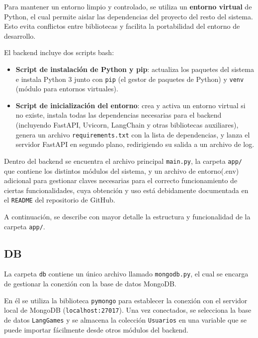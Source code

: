 Para mantener un entorno limpio y controlado, se utiliza un \textbf{entorno virtual} de Python, el cual permite aislar las dependencias del proyecto del resto del sistema. Esto evita conflictos entre bibliotecas y facilita la portabilidad del entorno de desarrollo.

El backend incluye dos scripts bash:

\begin{itemize}
	\item \textbf{Script de instalación de Python y pip}: actualiza los paquetes del sistema e instala Python 3 junto con \texttt{pip} (el gestor de paquetes de Python) y \texttt{venv} (módulo para entornos virtuales).
	
	\item \textbf{Script de inicialización del entorno}: crea y activa un entorno virtual si no existe, instala todas las dependencias necesarias para el backend (incluyendo FastAPI, Uvicorn, LangChain y otras bibliotecas auxiliares), genera un archivo \texttt{requirements.txt} con la lista de dependencias, y lanza el servidor FastAPI en segundo plano, redirigiendo su salida a un archivo de log.
\end{itemize}

Dentro del backend se encuentra el archivo principal \texttt{main.py}, la carpeta \texttt{app/} que contiene los distintos módulos del sistema, y un archivo de entorno(.env) adicional para gestionar claves necesarias para el correcto funcionamiento de ciertas funcionalidades, cuya obtención y uso está debidamente documentada en el \texttt{README} del repositorio de GitHub.

A continuación, se describe con mayor detalle la estructura y funcionalidad de la carpeta \texttt{app/}.


\subsection{DB}

La carpeta \texttt{db} contiene un único archivo llamado \texttt{mongodb.py}, el cual se encarga de gestionar la conexión con la base de datos MongoDB.

En él se utiliza la biblioteca \texttt{pymongo} para establecer la conexión con el servidor local de MongoDB (\texttt{localhost:27017}). Una vez conectados, se selecciona la base de datos \texttt{LangGames} y se almacena la colección \texttt{Usuarios} en una variable que se puede importar fácilmente desde otros módulos del backend.

